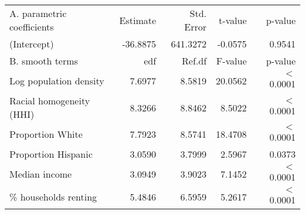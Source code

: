 \begin{table}[ht]
\centering
\begin{tabular}{lrrrr}
   \hline
A. parametric coefficients & Estimate & Std. Error & t-value & p-value \\ 
  (Intercept) & -36.8875 & 641.3272 & -0.0575 & 0.9541 \\ 
   \hline
B. smooth terms & edf & Ref.df & F-value & p-value \\ 
  Log population density & 7.6977 & 8.5819 & 20.0562 & $<$ 0.0001 \\ 
  Racial homogeneity (HHI) & 8.3266 & 8.8462 & 8.5022 & $<$ 0.0001 \\ 
  Proportion White & 7.7923 & 8.5741 & 18.4708 & $<$ 0.0001 \\ 
  Proportion Hispanic & 3.0590 & 3.7999 & 2.5967 & 0.0373 \\ 
  Median income & 3.0949 & 3.9023 & 7.1452 & $<$ 0.0001 \\ 
  \% households renting & 5.4846 & 6.5959 & 5.2617 & $<$ 0.0001 \\ 
   \hline
\end{tabular}
\caption{ } 
\label{Demographic GAM}
\end{table}
